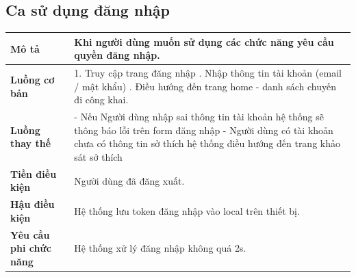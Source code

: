 \subsection{Ca sử dụng đăng nhập}
\vspace{0.5cm}

\noindent 
\begin{tabularx}{\linewidth}{| l | X |} 
\hline 
\textbf{Mô tả} & Khi người dùng muốn sử dụng các chức năng yêu cầu quyền đăng nhập. \\ 
\hline 
\textbf{Luồng cơ bản} & 1. Truy cập trang đăng nhập \newline 
                      2. Nhập thông tin tài khoản (email / mật khẩu) \newline 
                      3. Điều hướng đến trang home - danh sách chuyến đi công khai. \\ 
\hline 
\textbf{Luồng thay thế} & - Nếu Người dùng nhập sai thông tin tài khoản hệ thống sẽ thông báo lỗi trên form đăng nhập  \newline 
                       - Người dùng có tài khoản chưa có thông tin sở thích hệ thống điều hướng đến trang khảo sát sở thích \\
\hline 
\textbf{Tiền điều kiện} & Người dùng đã đăng xuất. \\ 
\hline 
\textbf{Hậu điều kiện} & Hệ thống lưu token đăng nhập vào local trên thiết bị. \\ 
\hline 
\textbf{Yêu cầu phi chức năng} & Hệ thống xử lý đăng nhập không quá 2s. \\ 
\hline 
\end{tabularx}

\vspace{0.8cm}


